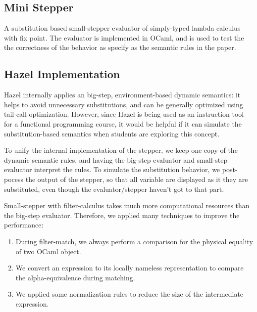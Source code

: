 
\subsection{Mini Stepper}

A substitution based small-stepper evaluator of simply-typed lambda
calculus with fix point. The evaluator is implemented in OCaml, and is
used to test the the correctness of the behavior as specify as the
semantic rules in the paper.

\subsection{Hazel Implementation}

Hazel internally applies an big-step, environment-based dynamic
semantics: it helps to avoid unnecessary substitutions, and can be
generally optimized using tail-call optimization. However, since Hazel
is being used as an instruction tool for a functional programming
course, it would be helpful if it can simulate the substitution-based
semantics when students are exploring this concept.

To unify the internal implementation of the stepper, we keep one copy
of the dynamic semantic rules, and having the big-step evaluator and
small-step evaluator interpret the rules. To simulate the substitution
behavior, we post-pocess the output of the stepper, so that all
variable are displayed as it they are substituted, even though the
evaluator/stepper haven't got to that part.

Small-stepper with filter-calculus takes much more computational
resources than the big-step evaluator. Therefore, we applied many
techniques to improve the performance:

\begin{enumerate}
\item During filter-match, we always perform a comparison for the
  physical equality of two OCaml object.
\item We convert an expression to its locally nameless representation
  to compare the alpha-equivalence during matching.
\item We applied some normalization rules to reduce the size of the
  intermediate expression.
\end{enumerate}






